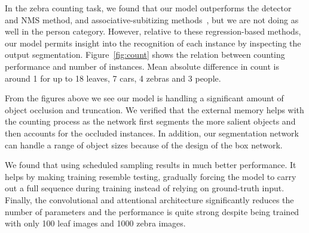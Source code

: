 In the zebra counting task, we found that our model outperforms the detector
and NMS method, and associative-subitizing methods~\cite{chattopadhyay16count},
but we are not doing as well in the person category. However, relative to these
regression-based methods,  our model permits insight into the recognition of
each instance by inspecting the output segmentation. Figure~\ref{fig:count}
shows the relation between counting performance and number of instances. Mean
absolute difference in count is around 1 for up to 18 leaves, 7 cars, 4 zebras
and 3 people.

From the figures above we see our model is handling a significant amount of
object occlusion and truncation. We verified that the external memory helps
with the counting process as the network first segments the more salient
objects and then accounts for the occluded instances. In addition, our
segmentation network can handle a range of object sizes because of the
design of the box network.

We found that using scheduled sampling results in much better performance. It
helps by making training resemble testing, gradually forcing the model
to carry out a full sequence during training instead of relying on ground-truth
input. Finally, the convolutional and attentional architecture
significantly reduces the number of parameters and the performance is quite
strong despite being trained with only 100 leaf images and 1000 zebra images.



